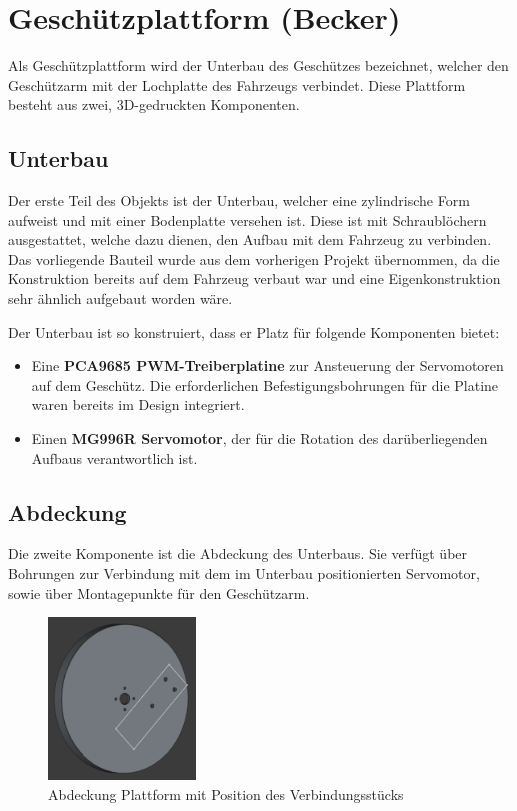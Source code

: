 \section{Geschützplattform (Becker)}

Als Geschützplattform wird der Unterbau des Geschützes
bezeichnet, welcher den Geschützarm mit der Lochplatte des
Fahrzeugs verbindet. Diese Plattform besteht aus zwei,
3D-gedruckten Komponenten.

\subsection{Unterbau}

Der erste Teil des Objekts ist der Unterbau, welcher eine zylindrische Form aufweist und mit einer Bodenplatte versehen ist. 
Diese ist mit Schraublöchern ausgestattet, welche dazu dienen, den Aufbau mit dem Fahrzeug zu verbinden. 
Das vorliegende Bauteil wurde aus dem vorherigen Projekt übernommen, da die Konstruktion bereits auf dem Fahrzeug verbaut war 
und eine Eigenkonstruktion sehr ähnlich aufgebaut worden wäre.

Der Unterbau ist so konstruiert, dass er Platz für folgende Komponenten bietet:
\begin{itemize}
    \item Eine \textbf{PCA9685 PWM-Treiberplatine} zur Ansteuerung der
     Servomotoren auf dem Geschütz. Die erforderlichen Befestigungsbohrungen für die Platine waren bereits im Design integriert.
    \item Einen \textbf{MG996R Servomotor}, der für die Rotation des
     darüberliegenden Aufbaus verantwortlich ist.
\end{itemize}

\subsection{Abdeckung}
  
Die zweite Komponente ist die Abdeckung des Unterbaus. 
Sie verfügt über Bohrungen zur Verbindung mit dem im Unterbau positionierten Servomotor, sowie über Montagepunkte für den Geschützarm.

\begin{figure}[ht]
    \centering
    \includegraphics[width=0.35\textwidth, keepaspectratio]{images/becker_cad_platform.png}
    \caption{Abdeckung Plattform mit Position des Verbindungsstücks}
    \label{fig:cad_platform}
\end{figure}

